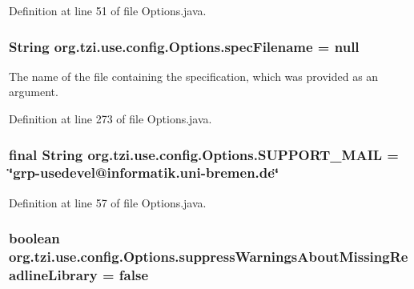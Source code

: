 Definition at line 51 of file Options.\-java.

\hypertarget{classorg_1_1tzi_1_1use_1_1config_1_1_options_a9393d18c0cd6039beb429ba008a2cde2}{
\subsubsection[{spec\-Filename}]{\setlength{\rightskip}{0pt plus 5cm}String org.\-tzi.\-use.\-config.\-Options.\-spec\-Filename = null\hspace{0.3cm}{\ttfamily [static]}}}\label{classorg_1_1tzi_1_1use_1_1config_1_1_options_a9393d18c0cd6039beb429ba008a2cde2}
The name of the file containing the specification, which was provided as an argument. 

Definition at line 273 of file Options.\-java.

\hypertarget{classorg_1_1tzi_1_1use_1_1config_1_1_options_a9802ac86d23221159c639062f27fdc18}{
\subsubsection[{S\-U\-P\-P\-O\-R\-T\-\_\-\-M\-A\-I\-L}]{\setlength{\rightskip}{0pt plus 5cm}final String org.\-tzi.\-use.\-config.\-Options.\-S\-U\-P\-P\-O\-R\-T\-\_\-\-M\-A\-I\-L = \char`\"{}grp-\/usedevel@informatik.\-uni-\/bremen.\-de\char`\"{}\hspace{0.3cm}{\ttfamily [static]}}}\label{classorg_1_1tzi_1_1use_1_1config_1_1_options_a9802ac86d23221159c639062f27fdc18}


Definition at line 57 of file Options.\-java.

\hypertarget{classorg_1_1tzi_1_1use_1_1config_1_1_options_a9690cdff39fd7a0c59215b0fb0513b85}{
\subsubsection[{suppress\-Warnings\-About\-Missing\-Readline\-Library}]{\setlength{\rightskip}{0pt plus 5cm}boolean org.\-tzi.\-use.\-config.\-Options.\-suppress\-Warnings\-About\-Missing\-Readline\-Library = false\hspace{0.3cm}{\ttfamily [static]}}}\label{classorg_1_1tzi_1_1use_1_1config_1_1_options_a9690cdff39fd7a0c59215b0fb0513b85}


